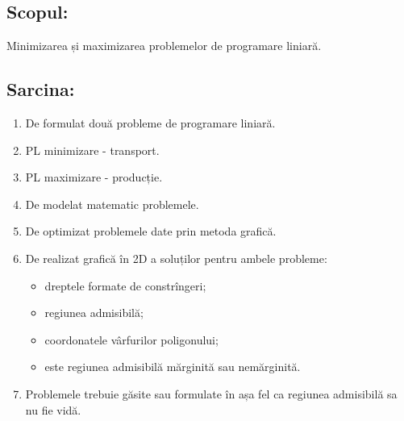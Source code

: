 \documentclass[14pt,a4paper]{extreport}
\begin{document}


\clearpage
\subsection*{Scopul:\\}
Minimizarea și maximizarea problemelor de programare liniară.

\subsection*{Sarcina:}
\begin{enumerate}
	\item De formulat două probleme de programare liniară.
	\item PL minimizare - transport.
	\item PL maximizare - producție.
	\item De modelat matematic problemele.
	\item De optimizat problemele date prin metoda grafică.
	\item De realizat grafică în 2D a soluților pentru ambele
probleme: 
	\begin{itemize}
		\item dreptele formate de constrîngeri;
		\item regiunea admisibilă;
		\item coordonatele vârfurilor poligonului;
		\item este regiunea admisibilă mărginită sau nemărginită.
	\end{itemize}
	\item Problemele trebuie găsite sau formulate în așa fel ca regiunea admisibilă sa nu
fie vidă.
\end{enumerate}






\end{document}

